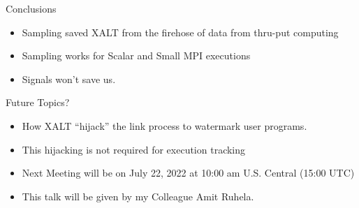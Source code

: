 \documentclass{beamer}
\begin{document}
\begin{frame}{Conclusions}
  \begin{itemize}
    \item Sampling saved XALT from the firehose of data from thru-put computing
    \item Sampling works for Scalar and Small MPI executions
    \item Signals won't save us.
  \end{itemize}
\end{frame}


\begin{frame}{Future Topics?}
  \begin{itemize}
    \item How XALT ``hijack'' the link process to watermark user
      programs.
    \item This hijacking is not required for execution tracking
    \item Next Meeting will be on July 22, 2022 at 10:00 am
      U.S. Central (15:00 UTC)
    \item This talk will be given by my Colleague Amit Ruhela.
  \end{itemize}
\end{frame}
%

%
\end{document}
